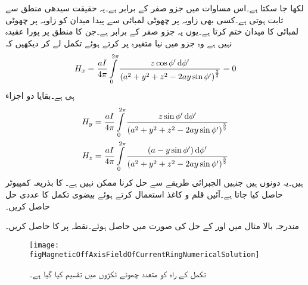 لکھا جا سکتا ہے۔اس مساوات میں  جزو صفر کے برابر ہے۔یہ حقیقت سیدھی منطق سے ثابت ہوتی ہے۔کسی بھی زاویہ  پر چھوٹی لمبائی سے پیدا میدان کو زاویہ  پر چھوٹی لمبائی کا میدان ختم کرتا ہے۔یوں یہ جزو صفر کے برابر ہے۔جن کا منطق پر پورا عقیدہ نہیں ہے وہ  جزو میں نیا متغیرہ
  پر کرتے ہوئے تکمل لے کر دیکھیں کہ
\begin{align*}
H_x=\frac{a I}{4\pi}\int \limits_{0}^{2\pi} \frac{z\cos \phi' \dif \phi'}{\left(a^2+y^2+z^2-2 a y\sin \phi'\right)^{\frac{3}{2}}}=0
\end{align*}
ہی ہے۔بقایا دو اجزاء
\begin{gather}
\begin{aligned}\label{مساوات_مقناطیسی_دائرے_کا_محور_سے_دور_اجزاء}
H_y&=\frac{aI}{4\pi}\int\limits_0^{2\pi} \frac{z\sin \phi' \dif \phi'}{\left(a^2+y^2+z^2-2 a y\sin \phi'\right)^{\frac{3}{2}}}\\
H_z&=\frac{a I}{4\pi}\int \limits_{0}^{2\pi} \frac{(a-y\sin\phi') \dif \phi'}{\left(a^2+y^2+z^2-2 a y\sin \phi'\right)^{\frac{3}{2}}} 
\end{aligned}
\end{gather}
ہیں۔یہ دونوں  ہیں جنہیں الجبرائی طریقے سے حل کرنا ممکن نہیں ہے۔
 کا  بذریعہ کمپیوٹر حاصل کیا جاتا ہے۔آئیں قلم و کاغذ استعمال کرتے ہوئے بیضوی تکمل کا عددی حل حاصل کریں۔

مندرجہ بالا مثال میں  اور  کے حل    کی صورت میں حاصل ہوئے۔نقطہ  پر  کا  حاصل کریں۔
\begin{figure}
\centering
\texttt{[image: figMagneticOffAxisFieldOfCurrentRingNumericalSolution]}
\caption{تکمل کے راہ کو متعدد چھوٹے ٹکڑوں میں تقسیم کیا گیا ہے۔}
\label{شکل_مقناطیسی_عددی_حل_دائرہ_برقی_رو}
\end{figure}

